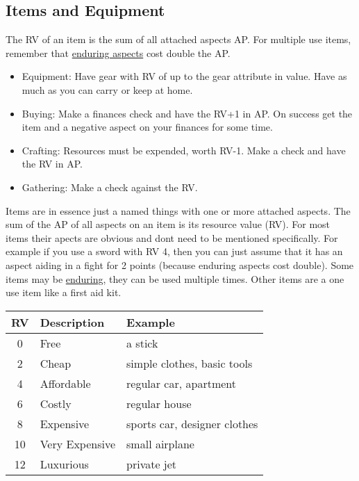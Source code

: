 \documentclass[11pt]{article}
\begin{document}
{\subsection{Items and Equipment}
\label{sec:orgfee39cc}
\begin{short}
The RV of an item is the sum of all attached aspects AP. For multiple use items, remember that \hyperref[sec:orgafbb491]{enduring aspects} cost double the AP.
\begin{itemize}
\item Equipment: Have gear with RV of up to the gear attribute in value. Have as much as you can carry or keep at home.
\item Buying: Make a finances check and have the RV+1 in AP. On success get the item and a negative aspect  on your finances for some time.
\item Crafting: Resources must be expended, worth RV-1. Make a check and have the RV in AP.
\item Gathering: Make a check against the RV.
\end{itemize}
\end{short}

Items are in essence just a named things with one or more attached aspects. The sum of the AP of all aspects on an item is its resource value (RV). For most items their apects are obvious and dont need to be mentioned specifically. For example if you use a sword with RV 4, then you can just assume that it has an aspect aiding in a fight for 2 points (because enduring aspects cost double). Some items may be \hyperref[sec:orgafbb491]{enduring}, they can be used multiple times. Other items are a one use item like a first aid kit. 

\begin{center}
\begin{tabular}{c|l|l}
\textbf{RV} & \textbf{Description} & \textbf{Example}\\
\hline
0 & Free & a stick\\
2 & Cheap & simple clothes, basic tools\\
4 & Affordable & regular car, apartment\\
6 & Costly & regular house\\
8 & Expensive & sports car, designer clothes\\
10 & Very Expensive & small airplane\\
12 & Luxurious & private jet\\
\end{tabular}
\end{center}
}
\end{document}
